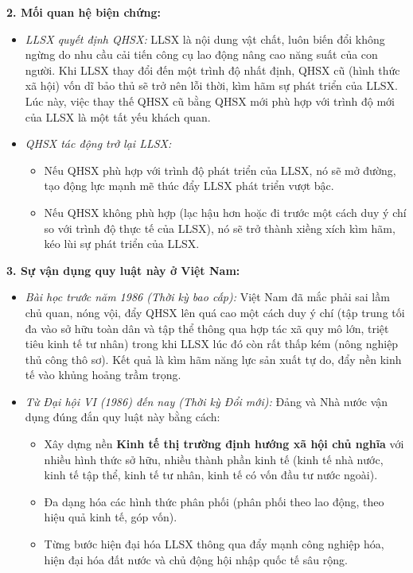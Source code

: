 \documentclass[12pt,a4paper]{article}
\begin{document}
{\noindent
\textbf{2. Mối quan hệ biện chứng:}
\begin{itemize}
    \item \textit{LLSX quyết định QHSX:} LLSX là nội dung vật chất, luôn biến đổi không ngừng do nhu cầu cải tiến công cụ lao động nâng cao năng suất của con người. Khi LLSX thay đổi đến một trình độ nhất định, QHSX cũ (hình thức xã hội) vốn dĩ bảo thủ sẽ trở nên lỗi thời, kìm hãm sự phát triển của LLSX. Lúc này, việc thay thế QHSX cũ bằng QHSX mới phù hợp với trình độ mới của LLSX là một tất yếu khách quan.
    \item \textit{QHSX tác động trở lại LLSX:}
    \begin{itemize}
        \item Nếu QHSX phù hợp với trình độ phát triển của LLSX, nó sẽ mở đường, tạo động lực mạnh mẽ thúc đẩy LLSX phát triển vượt bậc.
        \item Nếu QHSX không phù hợp (lạc hậu hơn hoặc đi trước một cách duy ý chí so với trình độ thực tế của LLSX), nó sẽ trở thành xiềng xích kìm hãm, kéo lùi sự phát triển của LLSX.
    \end{itemize}
\end{itemize}

\noindent
\textbf{3. Sự vận dụng quy luật này ở Việt Nam:}
\begin{itemize}
    \item \textit{Bài học trước năm 1986 (Thời kỳ bao cấp):} Việt Nam đã mắc phải sai lầm chủ quan, nóng vội, đẩy QHSX lên quá cao một cách duy ý chí (tập trung tối đa vào sở hữu toàn dân và tập thể thông qua hợp tác xã quy mô lớn, triệt tiêu kinh tế tư nhân) trong khi LLSX lúc đó còn rất thấp kém (nông nghiệp thủ công thô sơ). Kết quả là kìm hãm năng lực sản xuất tự do, đẩy nền kinh tế vào khủng hoảng trầm trọng.
    \item \textit{Từ Đại hội VI (1986) đến nay (Thời kỳ Đổi mới):} Đảng và Nhà nước vận dụng đúng đắn quy luật này bằng cách:
    \begin{itemize}
        \item Xây dựng nền \textbf{Kinh tế thị trường định hướng xã hội chủ nghĩa} với nhiều hình thức sở hữu, nhiều thành phần kinh tế (kinh tế nhà nước, kinh tế tập thể, kinh tế tư nhân, kinh tế có vốn đầu tư nước ngoài).
        \item Đa dạng hóa các hình thức phân phối (phân phối theo lao động, theo hiệu quả kinh tế, góp vốn).
        \item Từng bước hiện đại hóa LLSX thông qua đẩy mạnh công nghiệp hóa, hiện đại hóa đất nước và chủ động hội nhập quốc tế sâu rộng.
    \end{itemize}
\end{itemize}

}
\end{document}
